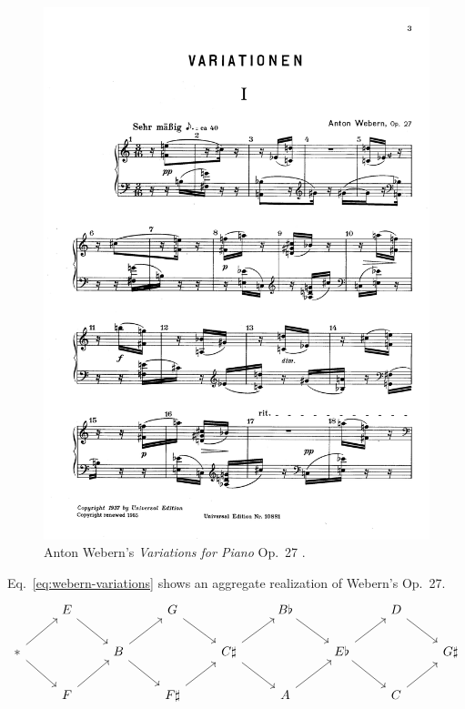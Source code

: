 \begin{figure}[htbp]
    \centering
	\includegraphics[width=6.5in]{figures/webern1.pdf}
	\caption[Webern's Op.~27]{Anton Webern's \emph{Variations for Piano} Op.~27 \cite[203]{Starr1984}.}
	\label{fig:webern-variations}
\end{figure}

\begin{example}
    \cite[204]{Starr1984}
    \label{ex:webern-variations}
    Eq.~\ref{eq:webern-variations} shows an aggregate realization of Webern's Op.~27.
    \begin{equation}
    \label{eq:webern-variations}
    \begin{tikzcd}
		& E \arrow[dr] && G \arrow[dr] && B\flat \arrow[dr] && D \arrow[dr] & \\
		* \arrow[dr] \arrow[ur] && B \arrow[dr] \arrow[ur] && C\sharp \arrow[dr] \arrow[ur] && E\flat \arrow[dr] \arrow[ur] && G\sharp \\
		& F \arrow[ur] && F\sharp \arrow[ur] && A \arrow[ur] && C \arrow[ur] &
	\end{tikzcd}	
    \end{equation}
\end{example}

